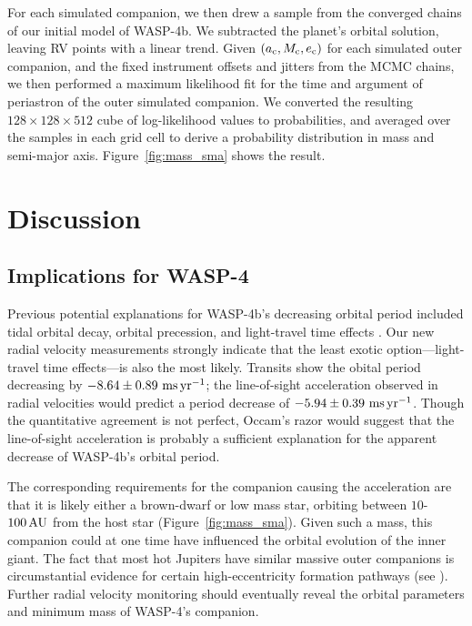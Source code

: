 \documentclass[12pt,twocolumn,tighten]{aastex62}
\begin{document}
For each simulated companion, we then drew a sample from the converged
chains of our initial model of WASP-4b. We subtracted the planet's
orbital solution, leaving RV points with a linear trend.  Given
$(a_{\rm c}, M_{\rm c}, e_{\rm c})$ for each simulated outer
companion, and the fixed instrument offsets and jitters from the MCMC
chains, we then performed a maximum likelihood fit for the time and
argument of periastron of the outer simulated companion.  We converted
the resulting $128\times128\times512$ cube of log-likelihood values to
probabilities, and averaged over the samples in each grid cell to
derive a probability distribution in mass and semi-major axis.
Figure~\ref{fig:mass_sma} shows the result.



\section{Discussion}
\label{sec:discussion}

\subsection{Implications for WASP-4}
Previous potential explanations for WASP-4b's decreasing orbital
period included tidal orbital decay, orbital precession, and
light-travel time effects \citep{bouma_wasp4b_2019}.  Our new radial
velocity measurements strongly indicate that the least exotic
option---light-travel time effects---is also the most likely.
Transits show the obital period decreasing by $- 8.64 \pm 0.89~{\rm
ms}\,{\rm yr}^{-1}$; the line-of-sight acceleration observed in radial
velocities would predict a period decrease of $-5.94 \pm 0.39~{\rm
ms}\,{\rm yr}^{-1}$.  Though the quantitative agreement is not
perfect, Occam's razor would suggest that the line-of-sight
acceleration is probably a sufficient explanation for the apparent
decrease of WASP-4b's orbital period.

The corresponding requirements for the companion causing the
acceleration are that it is likely either a brown-dwarf or low mass
star, orbiting between $10$-$100\,{\rm AU}$ from the host star
(Figure~\ref{fig:mass_sma}).  Given such a mass, this companion could
at one time have influenced the orbital evolution of the inner giant.
The fact that most hot Jupiters have similar massive outer companions
\citep{knutson_friends_2014,bryan_statistics_2016} is circumstantial
evidence for certain high-eccentricity formation pathways (see
\citealt{dawson_johnson_2018}).  Further radial velocity monitoring
should eventually reveal the orbital parameters and minimum mass of
WASP-4's companion.
\end{document}
